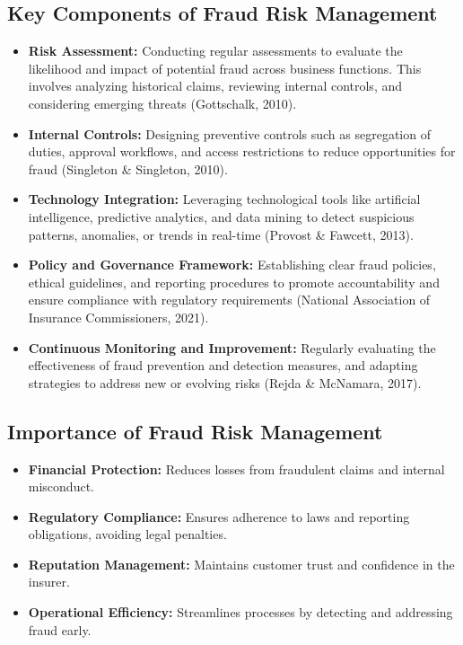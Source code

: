 \documentclass[12pt,a4paper]{article}
\begin{document}
\subsection{Key Components of Fraud Risk Management}
\begin{itemize}
    \item \textbf{Risk Assessment:} Conducting regular assessments to evaluate the likelihood and impact of potential fraud across business functions. This involves analyzing historical claims, reviewing internal controls, and considering emerging threats (Gottschalk, 2010).
    \item \textbf{Internal Controls:} Designing preventive controls such as segregation of duties, approval workflows, and access restrictions to reduce opportunities for fraud (Singleton \& Singleton, 2010).
    \item \textbf{Technology Integration:} Leveraging technological tools like artificial intelligence, predictive analytics, and data mining to detect suspicious patterns, anomalies, or trends in real-time (Provost \& Fawcett, 2013).
    \item \textbf{Policy and Governance Framework:} Establishing clear fraud policies, ethical guidelines, and reporting procedures to promote accountability and ensure compliance with regulatory requirements (National Association of Insurance Commissioners, 2021).
    \item \textbf{Continuous Monitoring and Improvement:} Regularly evaluating the effectiveness of fraud prevention and detection measures, and adapting strategies to address new or evolving risks (Rejda \& McNamara, 2017).
\end{itemize}

\subsection{Importance of Fraud Risk Management}
\begin{itemize}
    \item \textbf{Financial Protection:} Reduces losses from fraudulent claims and internal misconduct.
    \item \textbf{Regulatory Compliance:} Ensures adherence to laws and reporting obligations, avoiding legal penalties.
    \item \textbf{Reputation Management:} Maintains customer trust and confidence in the insurer.
    \item \textbf{Operational Efficiency:} Streamlines processes by detecting and addressing fraud early.
\end{itemize}
\end{document}
